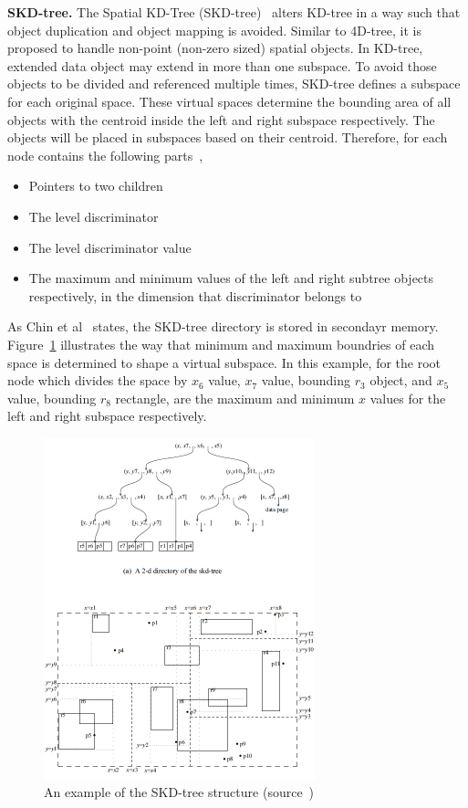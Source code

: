 \documentclass[a4paper,12pt]{article}
\begin{document}
\textbf{SKD-tree.} The Spatial KD-Tree (SKD-tree)~\cite{skdtree} alters KD-tree in a way such that object duplication and object mapping is avoided. Similar to 4D-tree, it is proposed to handle non-point (non-zero sized) spatial objects. In KD-tree, extended data object may extend in more than one subspace. To avoid those objects to be divided and referenced multiple times, SKD-tree defines a subspace for each original space. These virtual spaces determine the bounding area of all objects with the centroid inside the left and right subspace respectively. The objects will be placed in subspaces based on their centroid. Therefore, for each node contains the following parts~\cite{skdtreebook},
\begin{itemize}
\item Pointers to two children
\item The level discriminator
\item The level discriminator value
\item The maximum and minimum values of the left and right subtree objects respectively, in the dimension that discriminator belongs to
\end{itemize}    
As Chin et al~\cite{survey} states, the SKD-tree directory is stored in secondayr memory. Figure~\ref{figskdtree} illustrates the way that minimum and maximum boundries of each space is determined to shape a virtual subspace. In this example, for the root node which divides the space by $x_6$ value, $x_7$ value, bounding $r_3$ object, and $x_5$ value, bounding $r_8$ rectangle, are the maximum and minimum $x$ values for the left and right subspace respectively.
\begin{figure}
\centering
\includegraphics[width=0.7\textwidth,height=0.6\textheight]{skdtree}
\caption{An example of the SKD-tree structure (source~\cite{survey})}
\label{figskdtree}
\end{figure}
\end{document}
